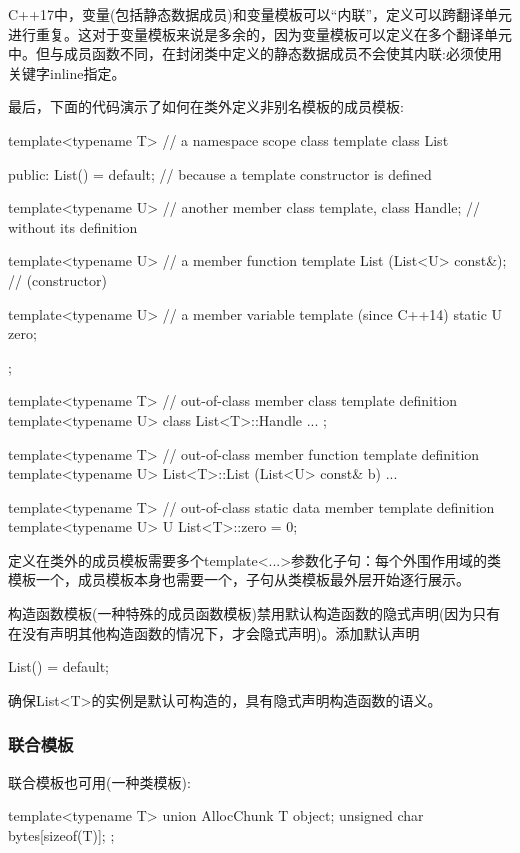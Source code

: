 C++17中，变量(包括静态数据成员)和变量模板可以“内联”，定义可以跨翻译单元进行重复。这对于变量模板来说是多余的，因为变量模板可以定义在多个翻译单元中。但与成员函数不同，在封闭类中定义的静态数据成员不会使其内联:必须使用关键字inline指定。

最后，下面的代码演示了如何在类外定义非别名模板的成员模板:

\begin{cpp}
template<typename T> // a namespace scope class template
class List {
	public:
	List() = default; // because a template constructor is defined
	
	template<typename U> // another member class template,
	class Handle; // without its definition
	
	template<typename U> // a member function template
	List (List<U> const&); // (constructor)
	
	template<typename U> // a member variable template (since C++14)
	static U zero;
};

template<typename T> // out-of-class member class template definition
  template<typename U>
class List<T>::Handle {
	...
};

template<typename T> // out-of-class member function template definition
  template<typename U>
List<T>::List (List<U> const& b)
{
	...
}

template<typename T> // out-of-class static data member template definition
  template<typename U>
U List<T>::zero = 0;
\end{cpp}

定义在类外的成员模板需要多个template<...>参数化子句：每个外围作用域的类模板一个，成员模板本身也需要一个，子句从类模板最外层开始逐行展示。

构造函数模板(一种特殊的成员函数模板)禁用默认构造函数的隐式声明(因为只有在没有声明其他构造函数的情况下，才会隐式声明)。添加默认声明

\begin{cpp}
List() = default;
\end{cpp}

确保List<T>的实例是默认可构造的，具有隐式声明构造函数的语义。

\subsubsection{联合模板}

联合模板也可用(一种类模板):

\begin{cpp}
template<typename T>
union AllocChunk {
	T object;
	unsigned char bytes[sizeof(T)];
};
\end{cpp}

